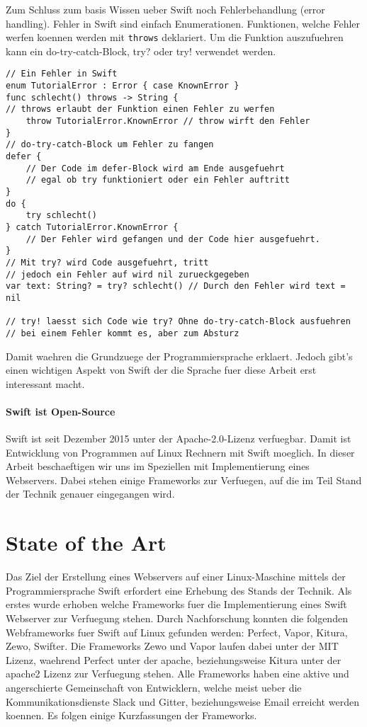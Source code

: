 Zum Schluss zum basis Wissen ueber Swift noch Fehlerbehandlung (error handling). Fehler in Swift sind einfach Enumerationen. Funktionen, welche Fehler werfen koennen werden mit \lstinline{throws} deklariert. Um die Funktion auszufuehren kann ein do-try-catch-Block, try? oder try! verwendet werden.
\begin{lstlisting}
// Ein Fehler in Swift
enum TutorialError : Error { case KnownError }
func schlecht() throws -> String { 
// throws erlaubt der Funktion einen Fehler zu werfen
    throw TutorialError.KnownError // throw wirft den Fehler
}
// do-try-catch-Block um Fehler zu fangen
defer {
    // Der Code im defer-Block wird am Ende ausgefuehrt
    // egal ob try funktioniert oder ein Fehler auftritt
}
do {
    try schlecht()
} catch TutorialError.KnownError {
    // Der Fehler wird gefangen und der Code hier ausgefuehrt.
}
// Mit try? wird Code ausgefuehrt, tritt
// jedoch ein Fehler auf wird nil zurueckgegeben
var text: String? = try? schlecht() // Durch den Fehler wird text = nil

// try! laesst sich Code wie try? Ohne do-try-catch-Block ausfuehren
// bei einem Fehler kommt es, aber zum Absturz 
\end{lstlisting}
Damit waehren die Grundzuege der Programmiersprache erklaert. Jedoch gibt’s einen wichtigen Aspekt von Swift der die Sprache fuer diese Arbeit erst interessant  macht.
\paragraph{Swift ist Open-Source}
\label{para:swiftistopensource}
Swift ist seit Dezember 2015 unter der Apache-2.0-Lizenz verfuegbar\parencite{swiftorg}. Damit ist Entwicklung von Programmen auf Linux Rechnern mit Swift moeglich. In dieser Arbeit beschaeftigen wir uns im Speziellen mit Implementierung eines Webservers.  Dabei stehen einige Frameworks zur Verfuegen, auf die im Teil Stand der Technik genauer eingegangen wird.
\section{State of the Art}
\label{sec:stateoftheart}
Das Ziel der Erstellung eines Webservers auf einer Linux-Maschine mittels der Programmiersprache Swift erfordert eine Erhebung des Stands der Technik. Als erstes wurde erhoben welche Frameworks fuer die Implementierung eines Swift Webserver zur Verfuegung stehen. Durch Nachforschung konnten die folgenden Webframeworks fuer Swift auf Linux gefunden werden:  Perfect\parencite{perfect}, Vapor\parencite{vapor}, Kitura\parencite{kitura}, Zewo\parencite{zewo}, Swifter\parencite{swifter}. Die Frameworks Zewo und Vapor laufen dabei unter der MIT Lizenz, waehrend Perfect unter der apache, beziehungsweise Kitura unter der apache2 Lizenz zur Verfuegung stehen. Alle Frameworks haben eine aktive und angerschierte Gemeinschaft von Entwicklern, welche meist ueber die Kommunikationsdienste Slack und Gitter, beziehungsweise Email erreicht werden koennen. Es folgen einige Kurzfassungen der Frameworks. 
